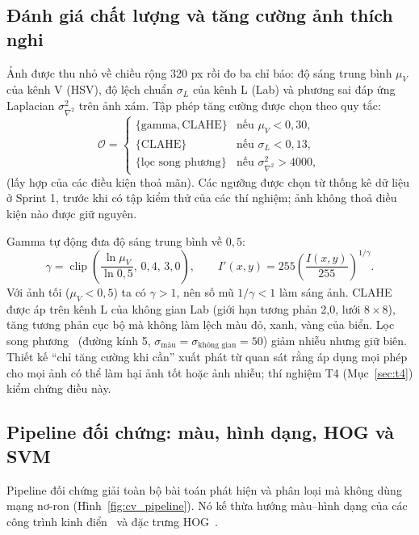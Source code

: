 \subsection{Đánh giá chất lượng và tăng cường ảnh thích nghi}
\label{sec:enhance}
Ảnh được thu nhỏ về chiều rộng 320 px rồi đo ba chỉ báo: độ sáng trung bình $\mu_V$ của kênh V (HSV), độ lệch chuẩn $\sigma_L$ của kênh L (Lab) và phương sai đáp ứng Laplacian $\sigma^2_{\nabla^2}$ trên ảnh xám. Tập phép tăng cường được chọn theo quy tắc:
\begin{equation}
 \mathcal{O}=
 \begin{cases}
  \{\text{gamma},\text{CLAHE}\} & \text{nếu } \mu_V<0{,}30,\\
  \{\text{CLAHE}\} & \text{nếu } \sigma_L<0{,}13,\\
  \{\text{lọc song phương}\} & \text{nếu } \sigma^2_{\nabla^2}>4000,
 \end{cases}
 \label{eq:enhance_rule}
\end{equation}
(lấy hợp của các điều kiện thoả mãn). Các ngưỡng được chọn từ thống kê dữ liệu ở Sprint 1, trước khi có tập kiểm thử của các thí nghiệm; ảnh không thoả điều kiện nào được giữ nguyên.

Gamma tự động đưa độ sáng trung bình về $0{,}5$:
\begin{equation}
 \gamma=\operatorname{clip}\!\left(\frac{\ln\mu_V}{\ln0{,}5},\,0{,}4,\,3{,}0\right),\qquad
 I'(x,y)=255\left(\frac{I(x,y)}{255}\right)^{1/\gamma}.
 \label{eq:gamma}
\end{equation}
Với ảnh tối ($\mu_V<0{,}5$) ta có $\gamma>1$, nên số mũ $1/\gamma<1$ làm sáng ảnh. CLAHE~\cite{zuiderveld1994clahe} được áp trên kênh L của không gian Lab (giới hạn tương phản 2,0, lưới $8\times8$), tăng tương phản cục bộ mà không làm lệch màu đỏ, xanh, vàng của biển. Lọc song phương~\cite{tomasi1998bilateral} (đường kính 5, $\sigma_{\text{màu}}=\sigma_{\text{không gian}}=50$) giảm nhiễu nhưng giữ biên. Thiết kế ``chỉ tăng cường khi cần'' xuất phát từ quan sát rằng áp dụng mọi phép cho mọi ảnh có thể làm hại ảnh tốt hoặc ảnh nhiễu; thí nghiệm T4 (Mục~\ref{sec:t4}) kiểm chứng điều này.

\subsection{Pipeline đối chứng: màu, hình dạng, HOG và SVM}
\label{sec:cv_pipeline}
Pipeline đối chứng giải toàn bộ bài toán phát hiện và phân loại mà không dùng mạng nơ-ron (Hình~\ref{fig:cv_pipeline}). Nó kế thừa hướng màu--hình dạng của các công trình kinh điển~\cite{escalera1997road,maldonado2007svm} và đặc trưng HOG~\cite{dalal2005hog}.

